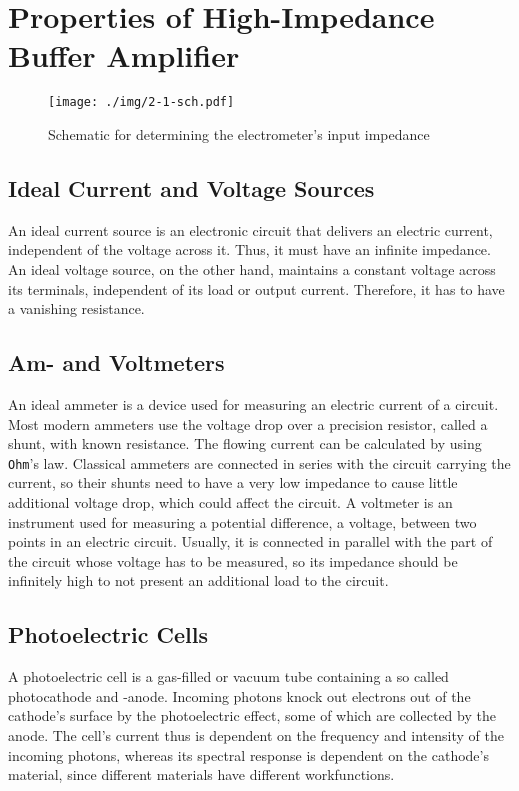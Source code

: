 \chapter{Properties of High-Impedance Buffer Amplifier}
\begin{figure}
	\centering
	\texttt{[image: ./img/2-1-sch.pdf]}
	\caption{Schematic for determining the electrometer's input impedance}
	\label{fig:elec_in_im}
\end{figure}

\section{Ideal Current and Voltage Sources}
An ideal current source is an electronic circuit that delivers an electric current, independent of the voltage across it.
Thus, it must have an infinite impedance.
An ideal voltage source, on the other hand, maintains a constant voltage across its terminals, independent of its load or output current.
Therefore, it has to have a vanishing resistance.

\section{Am- and Voltmeters}
An ideal ammeter is a device used for measuring an electric current of a circuit.
Most modern ammeters use the voltage drop over a precision resistor, called a shunt, with known resistance.
The flowing current can be calculated by using \texttt{Ohm}'s law.
Classical ammeters are connected in series with the circuit carrying the current, so their shunts need to have a very low impedance to cause little additional voltage drop, which could affect the circuit.
A voltmeter is an instrument used for measuring a potential difference, a voltage, between two points in an electric circuit.
Usually, it is connected in parallel with the part of the circuit whose voltage has to be measured, so its impedance should be infinitely high to not present an additional load to the circuit.

\section{Photoelectric Cells}
A photoelectric cell is a gas-filled or vacuum tube containing a so called photocathode and -anode.
Incoming photons knock out electrons out of the cathode's surface by the photoelectric effect, some of which are collected by the anode.%
The cell's current thus is dependent on the frequency and intensity of the incoming photons, whereas its spectral response is dependent on the cathode's material, since different materials have different workfunctions.

